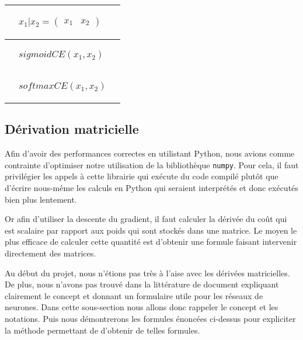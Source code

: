 \begin{center}
\begin{tabular}{|m{4cm}|m{}|m{}|}
\hline
\begin{center}\end{center} & \begin{center}$x_1|x_2 = \begin{pmatrix}x_1 & x_2\end{pmatrix}$\end{center} & \begin{center}$ $\end{center} \\
\hline
\begin{center}\end{center} & \begin{center}$sigmoidCE(x_1, x_2)$\end{center} & \begin{center}$ $\end{center} \\
\hline
\begin{center}\end{center} & \begin{center}$softmaxCE(x_1, x_2)$\end{center} & \begin{center}$ $\end{center} \\
\hline
\end{tabular}
\end{center}

\subsection{Dérivation matricielle}

Afin d'avoir des performances correctes en utilistant Python, nous avions comme contrainte d'optimiser notre utilisation de la bibliothèque \texttt{numpy}. Pour cela, il faut privilégier les appels à cette librairie qui exécute du code compilé plutôt que d'écrire nous-même les calculs en Python qui seraient interprétés et donc exécutés bien plus lentement.

Or afin d'utiliser la descente du gradient, il faut calculer la dérivée du coût qui est scalaire par rapport aux poids qui sont stockés dans une matrice. Le moyen le plus efficace  de calculer cette quantité est d'obtenir une formule faisant intervenir directement des matrices.

Au début du projet, nous n'étions pas très à l'aise avec les dérivées matricielles. De plus, nous n'avons pas trouvé dans la littérature de document expliquant clairement le concept et donnant un formulaire utile pour les réseaux de neurones. Dans cette sous-section nous allons donc rappeler le concept et les notations. Puis nous démontrerons les formules énoncées ci-dessus pour expliciter la méthode permettant de d'obtenir de telles formules.

